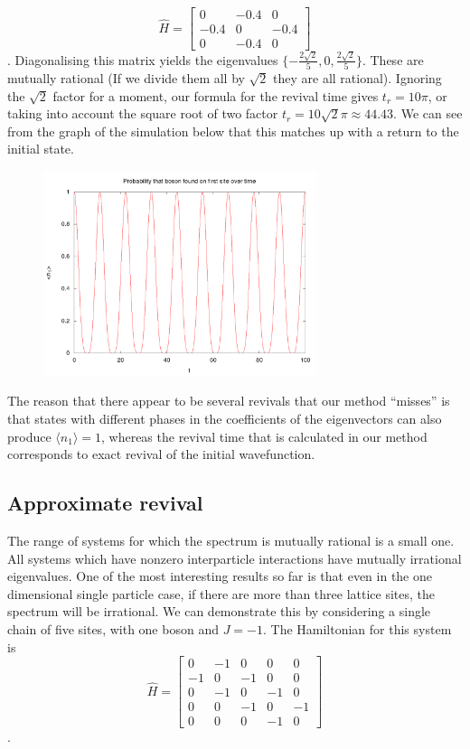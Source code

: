 \documentclass[a4paper,10pt]{article}
\begin{document}
{\begin{equation}
\hat{H}= \begin{bmatrix}
 0 & -0.4 & 0 \\
 -0.4 & 0 & -0.4\\
 0 & -0.4 & 0
 \end{bmatrix}
\end{equation}.
Diagonalising this matrix yields the eigenvalues $\{-\frac{2\sqrt{2}}{5},0,\frac{2\sqrt{2}}{5}\}$. These are mutually rational (If we divide them all by $\sqrt{2}$ they are all rational). Ignoring 
the $\sqrt{2}$ factor for a moment, our formula for the revival time gives $t_r=10\pi$, or taking into account the square root of two factor $t_r=10\sqrt{2}\pi\approx44.43$. We can see from the 
graph of the simulation below that this matches up with a return to the initial state.

\begin{figure}[H]
 \includegraphics[width=8cm]{showing_revival_3by1}
 \centering
\end{figure}

The reason that there appear to be several revivals that our method ``misses'' is that states with different phases in the coefficients of the eigenvectors can also produce $\langle n_1 \rangle =1$, whereas the revival time that is 
calculated in our method corresponds to exact revival of the initial wavefunction.

\subsection{Approximate revival}
The range of systems for which the spectrum  is mutually rational is a small one. 
All systems which have nonzero interparticle interactions have mutually irrational eigenvalues. One of the most interesting results so far is that even in the one dimensional single particle case,
if there are more than three lattice sites, the spectrum will be irrational. We can demonstrate this by considering a single chain of five sites, with one boson and $J=-1$. The Hamiltonian for this 
system is 
\begin{equation}
\hat{H}= \begin{bmatrix}
 0 & -1 & 0 & 0 & 0\\
 -1 & 0 & -1 & 0 & 0\\
 0 & -1 & 0 & -1 & 0\\
 0 & 0 & -1 & 0 & -1\\
 0 & 0 & 0 & -1 & 0
 \end{bmatrix}
\end{equation}.

}
\end{document}
